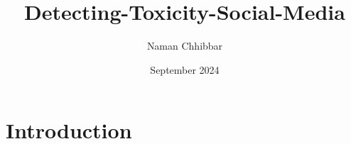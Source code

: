 \documentclass{article}
\title{Detecting-Toxicity-Social-Media}
\author{Naman Chhibbar}
\date{September 2024}
\begin{document}
\maketitle

\section{Introduction}
\end{document}
